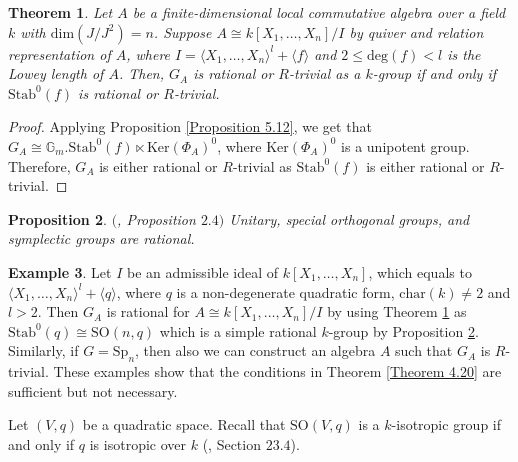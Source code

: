 \documentclass[12pt]{amsart}
\newtheorem{theorem}{Theorem}[section]
\newtheorem{proposition}[theorem]{Proposition}
\theoremstyle{definition}
\newtheorem{example}[theorem]{Example}
\numberwithin{equation}{section}
\begin{document}
\vskip2mm

\begin{theorem}\label{Theorem 5.13}
Let $A$ be a finite-dimensional local commutative algebra over a field $k$ with $\text{dim}(J/J^2)=n$. Suppose $A\cong k[X_1,\dots, X_n]/I$ by quiver and relation representation of $A$, where $I=\langle X_1,\dots, X_n\rangle^l+\langle f\rangle$ and $2\leq \mathrm{ deg}(f)<l$ is the Lowey length of $A$. Then, $G_A$ is rational or $R$-trivial as a $k$-group if and only if $\mathrm{Stab}^{0}(f)$ is rational or $R$-trivial.
\end{theorem}
\vskip1mm
\begin{proof}
Applying Proposition \ref{Proposition 5.12}, we get that $G_A\cong \mathbb{G}_m.\text{Stab}^{0}(f)\ltimes \text{Ker}(\Phi_A)^{0}$, where $\text{Ker}(\Phi_A)^{0}$ is a unipotent group. Therefore, $G_A$ is either rational or $R$-trivial as $\text{Stab}^{0}(f)$ is either rational or $R$-trivial.
\end{proof}

\vskip2mm
\begin{proposition}\label{Proposition 5.14}
$($\cite{CM}, \emph{Proposition} $2.4)$ Unitary, special orthogonal groups, and symplectic groups are rational.   
\end{proposition}

\vskip2mm
\begin{example}\label{Example 5.15}
Let $I$ be an admissible ideal of $k[X_1,\dots,X_n]$, which equals to $\langle X_1,\dots, X_n \rangle^l+\langle q\rangle$, where $q$ is a non-degenerate quadratic form, $\text{char}(k)\neq2$ and $l>2$. Then $G_A$ is rational for $A\cong k[X_1,\dots,X_n]/I$ by using Theorem \ref{Theorem 5.13} as $\text{Stab}^{0}(q)\cong\text{SO}(n,q)$ which is a simple rational $k$-group by Proposition \ref{Proposition 5.14}. Similarly, if $G=\mathrm{Sp}_n$, then also we can construct an algebra $A$ such that $G_A$ is $R$-trivial. These examples show that the conditions in Theorem \ref{Theorem 4.20} are sufficient but not necessary.
\end{example}

\vskip2mm 
\noindent
Let $(V,q)$ be a quadratic space. Recall that $\text{SO}(V,q)$ is a $k$-isotropic group if and only if $q$ is isotropic over $k$ (\cite{Borel}, Section $23.4$).
\end{document}
